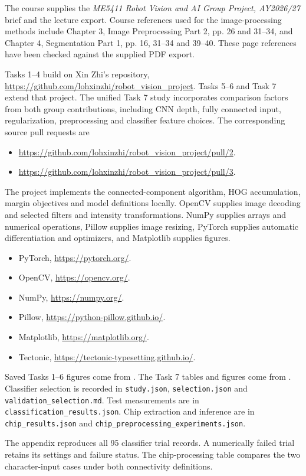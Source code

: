 The course supplies the \textit{ME5411 Robot Vision and AI Group Project, AY2026/27} brief and the lecture export. Course references used for the image-processing methods include Chapter 3, Image Preprocessing Part 2, pp. 26 and 31--34, and Chapter 4, Segmentation Part 1, pp. 16, 31--34 and 39--40. These page references have been checked against the supplied PDF export.

Tasks 1--4 build on Xin Zhi's repository, \url{https://github.com/lohxinzhi/robot_vision_project}. Tasks 5--6 and Task 7 extend that project. The unified Task 7 study incorporates comparison factors from both group contributions, including CNN depth, fully connected input, regularization, preprocessing and classifier feature choices. The corresponding source pull requests are
\begin{itemize}
\item \url{https://github.com/lohxinzhi/robot_vision_project/pull/2}.
\item \url{https://github.com/lohxinzhi/robot_vision_project/pull/3}.
\end{itemize}

The project implements the connected-component algorithm, HOG accumulation, margin objectives and model definitions locally. OpenCV supplies image decoding and selected filters and intensity transformations. NumPy supplies arrays and numerical operations, Pillow supplies image resizing, PyTorch supplies automatic differentiation and optimizers, and Matplotlib supplies figures.
\begin{itemize}
\item PyTorch, \url{https://pytorch.org/}.
\item OpenCV, \url{https://opencv.org/}.
\item NumPy, \url{https://numpy.org/}.
\item Pillow, \url{https://python-pillow.github.io/}.
\item Matplotlib, \url{https://matplotlib.org/}.
\item Tectonic, \url{https://tectonic-typesetting.github.io/}.
\end{itemize}

Saved Tasks 1--6 figures come from . The Task 7 tables and figures come from . Classifier selection is recorded in \texttt{study.json}, \texttt{selection.json} and \texttt{validation\_selection.md}. Test measurements are in \texttt{classification\_results.json}. Chip extraction and inference are in \texttt{chip\_results.json} and \texttt{chip\_preprocessing\_experiments.json}.

The appendix reproduces all 95 classifier trial records. A numerically failed trial retains its settings and failure status. The chip-processing table compares the two character-input cases under both connectivity definitions.
